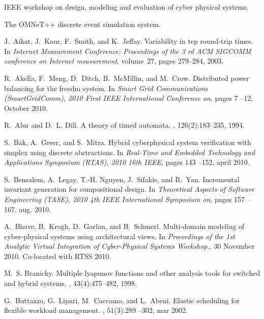 \documentclass{sig-alternate-ipsn13}
\begin{document}
\begin{thebibliography}{10}

\setlength{\itemsep}{-0.01mm}
\footnotesize

{IEEE} workshop on design, modeling and evaluation of cyber physical systems.

The {OMNeT}++ discrete event simulation system.

J.~Aikat, J.~Kaur, F.~Smith, and K.~Jeffay.
\newblock Variability in tcp round-trip times.
\newblock In {\em Internet Measurement Conference: Proceedings of the 3 rd ACM
  SIGCOMM conference on Internet measurement}, volume~27, pages 279--284, 2003.

R.~Akella, F.~Meng, D.~Ditch, B.~McMillin, and M.~Crow.
\newblock Distributed power balancing for the freedm system.
\newblock In {\em Smart Grid Communications (SmartGridComm), 2010 First IEEE
  International Conference on}, pages 7 --12, October 2010.

R.~Alur and D.~L. Dill.
\newblock A theory of timed automata.
, 126(2):183--235, 1994.

S.~Bak, A.~Greer, and S.~Mitra.
\newblock Hybrid cyberphysical system verification with simplex using discrete
  abstractions.
\newblock In {\em Real-Time and Embedded Technology and Applications Symposium
  (RTAS), 2010 16th IEEE}, pages 143 --152, april 2010.

S.~Bensalem, A.~Legay, T.-H. Nguyen, J.~Sifakis, and R.~Yan.
\newblock Incremental invariant generation for compositional design.
\newblock In {\em Theoretical Aspects of Software Engineering (TASE), 2010 4th
  IEEE International Symposium on}, pages 157 --167, aug. 2010.

A.~Bhave, B.~Krogh, D.~Garlan, and B.~Schmerl.
\newblock Multi-domain modeling of cyber-physical systems using architectural
  views.
\newblock In {\em Proceedings of the 1st Analytic Virtual Integration of
  Cyber-Physical Systems Workshop.}, 30 November 2010.
\newblock Co-located with RTSS 2010.

M.~S. Branicky.
\newblock Multiple lyapunov functions and other analysis tools for switched and
  hybrid systems.
, 43(4):475--482, 1998.

G.~Buttazzo, G.~Lipari, M.~Caccamo, and L.~Abeni.
\newblock Elastic scheduling for flexible workload management.
, 51(3):289 --302, mar 2002.


\end{thebibliography}
\end{document}
